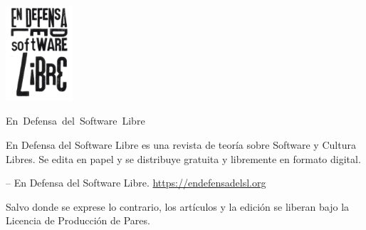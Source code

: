     \newpage
    \thispagestyle{empty}

    \begin{flushleft}

    \includegraphics[width=2.5cm]{images/logo.png}



    \hbox{\Large{En Defensa del Software Libre}}

    En Defensa del Software Libre es una revista de teoría sobre
    Software y Cultura Libres. Se edita en papel y se distribuye
    gratuita y libremente en formato digital.

    \vfill
    \copyleft  \the\year -- En Defensa del Software Libre.
    \url{https://endefensadelsl.org}

    Salvo donde se exprese lo contrario, los artículos y la edición se
    liberan bajo la Licencia de Producción de Pares.

    \end{flushleft}
   \newpage


